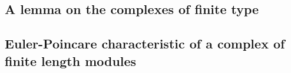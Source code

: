 \begin{proposition}[11.8.3]
\end{proposition}

\begin{env}[11.8.4]
\end{env}

\begin{proposition}[11.8.5]
\end{proposition}

\begin{env}[11.8.6]
\end{env}

\begin{remark}[11.8.7]
\end{remark}

\begin{env}[11.8.8]
\end{env}

\begin{proposition}[11.8.9]
\end{proposition}

\begin{env}[11.8.10]
\end{env}

\subsection{A lemma on the complexes of finite type}
\label{subsection:0.11.9}

\subsection{Euler-Poincare characteristic of a complex of finite length modules}
\label{subsection:0.11.10}